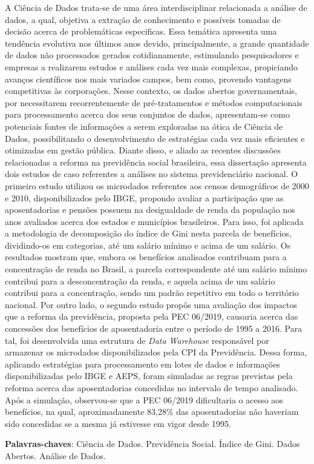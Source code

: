 
\setlength{\absparsep}{18pt} %
\begin{resumo}
A Ciência de Dados trata-se de uma área interdisciplinar relacionada a análise de dados, a qual, objetiva a extração de conhecimento e possíveis tomadas de decisão acerca de problemáticas especificas. Essa temática apresenta uma tendência evolutiva nos últimos anos devido, principalmente, a grande quantidade de dados não processados gerados cotidianamente, estimulando pesquisadores e empresas a realizarem estudos e análises cada vez mais complexas, propiciando avanços científicos nos mais variados campos, bem como, provendo vantagens competitivas às corporações. Nesse contexto, os dados abertos governamentais, por necessitarem recorrentemente de pré-tratamentos e métodos computacionais para processamento acerca dos seus conjuntos de dados, apresentam-se como potenciais fontes de informações a serem exploradas na ótica de Ciência de Dados, possibilitando o desenvolvimento de estratégias cada vez mais eficientes e otimizadas em gestão pública. Diante disso, e aliado as recentes discussões relacionadas a reforma na previdência social brasileira, essa dissertação apresenta dois estudos de caso referentes a análises no sistema previdenciário nacional. O primeiro estudo utilizou os microdados referentes aos censos demográficos de 2000 e 2010, disponibilizados pelo IBGE, propondo avaliar a participação que as aposentadorias e pensões possuem na desigualdade de renda da população nos anos avaliados acerca dos estados e municípios brasileiros. Para isso, foi aplicada a metodologia de decomposição do índice de Gini nesta parcela de benefícios, dividindo-os em categorias, até um salário mínimo e acima de um salário. Os resultados mostram que, embora os benefícios analisados contribuam para a concentração de renda no Brasil, a parcela correspondente até um salário mínimo contribui para a desconcentração da renda, e aquela acima de um salário contribui para a concentração, sendo um padrão repetitivo em todo o território nacional. Por outro lado, o segundo estudo propôs uma avaliação dos impactos que a reforma da previdência, proposta pela PEC 06/2019, causaria acerca das concessões dos benefícios de aposentadoria entre o período de 1995 a 2016. Para tal, foi desenvolvida uma estrutura de \textit{Data Warehouse} responsável por armazenar os microdados disponibilizados pela CPI da Previdência. Dessa forma, aplicando estratégias para processamento em lotes de dados e informações disponibilizadas pelo IBGE e AEPS, foram simuladas as regras previstas pela reforma acerca das aposentadorias concedidas no intervalo de tempo analisado. Após a simulação, observou-se que a PEC 06/2019 dificultaria o acesso aos benefícios, na qual, aproximadamente 83,28\% das aposentadorias não haveriam sido concedidas se a mesma já estivesse em vigor desde 1995.

\textbf{Palavras-chaves}: Ciência de Dados. Previdência Social. Índice de Gini. Dados Abertos. Análise de Dados.
\end{resumo}

